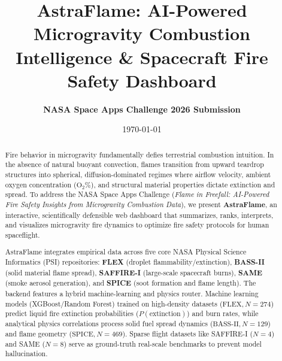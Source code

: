 \documentclass[11pt, a4paper]{article}
\title{\textbf{\LARGE AstraFlame: AI-Powered Microgravity Combustion Intelligence \& Spacecraft Fire Safety Dashboard}}
\author{\textbf{NASA Space Apps Challenge 2026 Submission}}
\date{\today}
\begin{document}
\maketitle

\begin{abstract}
Fire behavior in microgravity fundamentally defies terrestrial combustion intuition. In the absence of natural buoyant convection, flames transition from upward teardrop structures into spherical, diffusion-dominated regimes where airflow velocity, ambient oxygen concentration ($\mathrm{O_2\%}$), and structural material properties dictate extinction and spread. To address the NASA Space Apps Challenge (\textit{Flame in Freefall: AI-Powered Fire Safety Insights from Microgravity Combustion Data}), we present \textbf{AstraFlame}, an interactive, scientifically defensible web dashboard that summarizes, ranks, interprets, and visualizes microgravity fire dynamics to optimize fire safety protocols for human spaceflight.

AstraFlame integrates empirical data across five core NASA Physical Science Informatics (PSI) repositories: \textbf{FLEX} (droplet flammability/extinction), \textbf{BASS-II} (solid material flame spread), \textbf{SAFFIRE-I} (large-scale spacecraft burns), \textbf{SAME} (smoke aerosol generation), and \textbf{SPICE} (soot formation and flame length). The backend features a hybrid machine-learning and physics router. Machine learning models (XGBoost/Random Forest) trained on high-density datasets ($\text{FLEX}, N=274$) predict liquid fire extinction probabilities ($P(\text{extinction})$) and burn rates, while analytical physics correlations process solid fuel spread dynamics ($\text{BASS-II}, N=129$) and flame geometry ($\text{SPICE}, N=469$). Sparse flight datasets like SAFFIRE-I ($N=4$) and SAME ($N=8$) serve as ground-truth real-scale benchmarks to prevent model hallucination.


\end{abstract}
\end{document}
